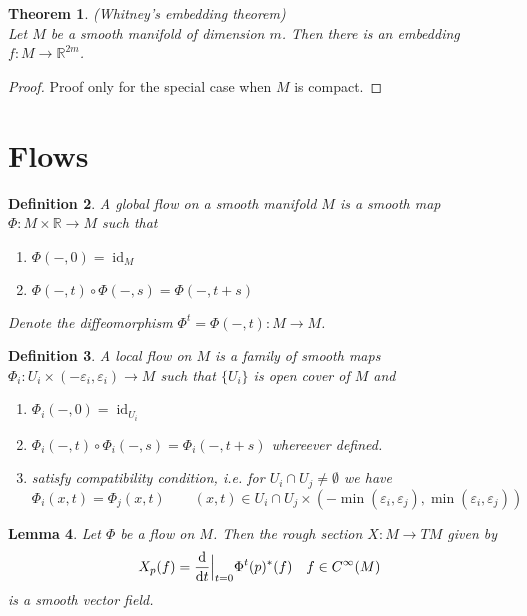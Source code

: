 \documentclass{article}
\newtheorem{theorem}{Theorem}
\numberwithin{theorem}{section}
\newtheorem{lemma}[theorem]{Lemma}
\newtheorem{definition}[theorem]{Definition}
\newcommand{\R}{\mathbb{R}}
\newcommand{\1}{\mathds{1}}
\DeclareMathOperator{\id}{id}
\begin{document}
\begin{theorem}(Whitney's embedding theorem)\\
    Let $M$ be a smooth manifold of dimension $m$. Then there is an embedding $f: M \to \R^{2m}$. 
    
\end{theorem}

\begin{proof}
    Proof only for the special case when $M$ is compact. 
\end{proof}

\section{Flows}

\begin{definition}
    A global flow on a smooth manifold $M$ is a smooth map $\Phi : M \times \R \to M$ such that 
    \begin{enumerate}
        \item $\Phi(-,0) = \id_M  $
        \item $\Phi(-, t) \circ \Phi(-,s) = \Phi(-, t+s) $
    \end{enumerate}
    Denote the diffeomorphism $\Phi^t = \Phi(-, t) : M \to M $. 
\end{definition}

\begin{definition}
    A local flow on $M$ is a family of smooth maps $\Phi_i : U_i \times (-\varepsilon_i, \varepsilon_i) \to M$ such that $\{ U_i \}$ is open cover of $M$ and
    \begin{enumerate}
        \item $\Phi_i(-,0) = \id_{U_i}  $
        \item $\Phi_i(-, t) \circ \Phi_i(-,s) = \Phi_i(-, t+s) $ whereever defined. 
        \item satisfy compatibility condition, i.e. for $U_i \cap U_j \neq \emptyset $ we have \[ \Phi_i(x,t) = \Phi_j(x,t) \qquad (x,t) \in U_i \cap U_j \times (-\min(\varepsilon_i, \varepsilon_j), \min(\varepsilon_i, \varepsilon_j)) \]
    \end{enumerate} 

\end{definition}

\begin{lemma}
    Let $\Phi$ be a flow on $M$. Then the rough section $X: M \to TM$ given by 
    \[ X_p(f) = \dv{}{t}\Big|_{t=0} \Phi^t(p)^*(f) \quad f \in C^\infty(M)  \]
    is a smooth vector field. 
\end{lemma}
\end{document}
